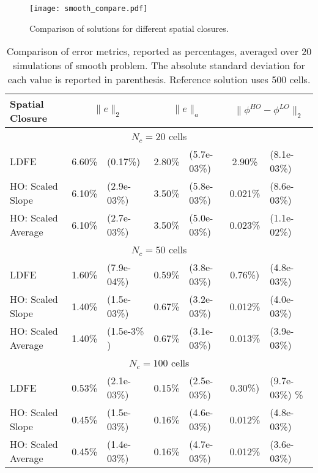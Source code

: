 \begin{figure}[H]
    \centering
    \texttt{[image: smooth\_compare.pdf]}
    \caption{\label{fig:smooth_compare} Comparison of solutions for different spatial closures.}
\end{figure}

\begin{table}[H]
    \caption{\label{tab:smooth} Comparison of error metrics, reported as percentages, averaged over 20 simulations of smooth problem.  The absolute
standard deviation for each value is reported in parenthesis. Reference solution uses 500 cells.}
    \begin{tabular}{|l|cl|cl|cl|} \hline
        Spatial Closure & \multicolumn{2}{|c|}{$\|e\|_2$}  & \multicolumn{2}{|c|}{$\|e\|_{a}$} & \multicolumn{2}{|c|}{$\|\phi^{HO}
        -\phi^{LO}\|_{2}$} \\  \hline \hline
        \multicolumn{7}{|c|}{$N_c = 20$ cells} \\ \hline
LDFE               &   6.60\%  &   (0.17\%)  &   2.80\%     &   (5.7e-03\%)  &   2.90\%   &  (8.1e-03\%)  \\
HO: Scaled Slope   &   6.10\%  &   (2.9e-03\%)  &   3.50\%  &   (5.8e-03\%)  &   0.021\%  &  (8.6e-03\%)  \\
HO: Scaled Average &   6.10\%  &   (2.7e-03\%)  &   3.50\%  &   (5.0e-03\%)  &   0.023\%  &  (1.1e-02\%)  \\ \hline
       \multicolumn{7}{|c|}{$N_c  = 50$ cells}   \\ \hline
LDFE               &   1.60\%  &   (7.9e-04\%)  &   0.59\%  &   (3.8e-03\%)  &   0.76\%)  &  (4.8e-03\%)  \\
HO: Scaled Slope   &   1.40\%  &   (1.5e-03\%)  &   0.67\%  &   (3.2e-03\%)  &   0.012\%  &  (4.0e-03\%)  \\
HO: Scaled Average &   1.40\%  &   (1.5e-3\% ) &   0.67\%   &   (3.1e-03\%)  &   0.013\%  &  (3.9e-03\%)  \\ \hline
       \multicolumn{7}{|c|}{$N_c  = 100$ cells}   \\ \hline
LDFE               &   0.53\%  &   (2.1e-03\%)  &   0.15\%  &   (2.5e-03\%)  &   0.30\%)  &  (9.7e-03\%)  \%\\
HO: Scaled Slope   &   0.45\%  &   (1.5e-03\%)  &   0.16\%  &   (4.6e-03\%)  &   0.012\%  &  (4.8e-03\%)  \\
HO: Scaled Average &   0.45\%  &   (1.4e-03\%)  &   0.16\%  &   (4.7e-03\%)  &   0.012\%  &  (3.6e-03\%)  \\ \hline
    \end{tabular}
\end{table}



